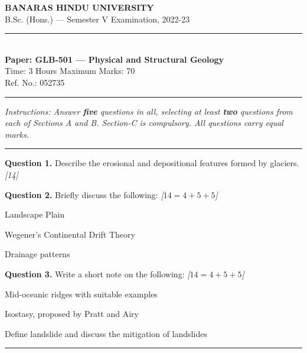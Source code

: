 \documentclass[11pt,a4paper]{article}
\newcommand{\pts}[1]{\hfill   \textit{[#1]}}
\begin{document}
\begin{center}
  {\large\bfseries BANARAS HINDU UNIVERSITY}\\[2pt]
  {\normalsize B.Sc. (Hons.) --- Semester V Examination, 2022-23}\\[6pt]
  \rule{0.8\linewidth}{0.5pt}\\[6pt]
  {\large\bfseries Paper: GLB-501 --- Physical and Structural Geology}\\[4pt]
  {\normalsize Time: 3 Hours \hfill Maximum Marks: 70}\\[2pt]
  {\small Ref. No.: 052735}
\end{center}
\rule{\linewidth}{0.4pt}
\smallskip



\noindent   \textit{Instructions: Answer   \textbf{five} questions in all, selecting at least   \textbf{two} questions from each of Sections A and B. Section-C is compulsory. All questions carry equal marks.}
\bigskip

\bigskip


\rule{\linewidth}{0.4pt}\smallskip




\noindent   \textbf{Question 1.} Describe the erosional and depositional features formed by glaciers. \pts{14}

\medskip


\noindent   \textbf{Question 2.} Briefly discuss the following: \pts{$14 = 4+5+5$}

\begin{parts}
  \item Landscape Plain
  \item Wegener's Continental Drift Theory
  \item Drainage patterns
\end{parts}

\medskip


\noindent   \textbf{Question 3.} Write a short note on the following: \pts{$14 = 4+5+5$}

\begin{parts}
  \item Mid-oceanic ridges with suitable examples
  \item Isostasy, proposed by Pratt and Airy
  \item Define landslide and discuss the mitigation of landslides
\end{parts}

\bigskip


\rule{\linewidth}{0.4pt}\smallskip
\end{document}
